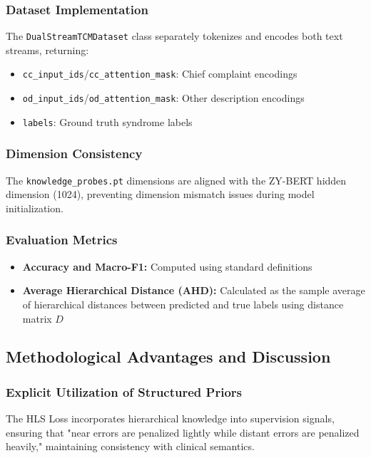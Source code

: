 \documentclass{article}
\begin{document}
\subsubsection{Dataset Implementation}

The \texttt{DualStreamTCMDataset} class separately tokenizes and encodes both text streams, returning:
\begin{itemize}
    \item \texttt{cc\_input\_ids}/\texttt{cc\_attention\_mask}: Chief complaint encodings
    \item \texttt{od\_input\_ids}/\texttt{od\_attention\_mask}: Other description encodings
    \item \texttt{labels}: Ground truth syndrome labels
\end{itemize}

\subsubsection{Dimension Consistency}

The \texttt{knowledge\_probes.pt} dimensions are aligned with the ZY-BERT hidden dimension (1024), preventing dimension mismatch issues during model initialization.

\subsubsection{Evaluation Metrics}

\begin{itemize}
    \item \textbf{Accuracy and Macro-F1:} Computed using standard definitions
    \item \textbf{Average Hierarchical Distance (AHD):} Calculated as the sample average of hierarchical distances between predicted and true labels using distance matrix $D$
\end{itemize}

\subsection{Methodological Advantages and Discussion}

\subsubsection{Explicit Utilization of Structured Priors}

The HLS Loss incorporates hierarchical knowledge into supervision signals, ensuring that "near errors are penalized lightly while distant errors are penalized heavily," maintaining consistency with clinical semantics.
\end{document}
